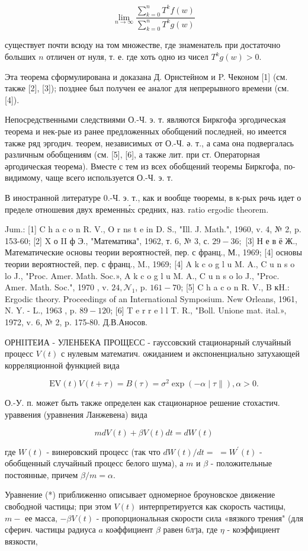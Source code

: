 \documentclass[10pt]{article}
\begin{document}
\[
\lim _{n \rightarrow \infty} \frac{\sum_{k=0}^{n} T^{k} f(w)}{\sum_{k=0}^{n} T^{k} g(w)}
\]

существует почти всюду на том множестве, где знаменатель при достаточно больших $n$ отличен от нуля, т. е. где хоть одно из чисел $T^{k} g(w)>0$.

Эта теорема сформулирована и доказана Д. Орнстейном и P. Чеконом [1] (см. также [2], [3]); позднее был получен ее аналог для непрерывного времени (см. [4]).

Непосредственными следствиями О.-Ч. э. т. являются Биркгофа эргодическая теорема и нек-рые из ранее предложенных обобщений последней, но имеется также ряд эргодич. теорем, независимых от О.-Ч. ә. т., а сама она подвергалась различным обобщениям (см. [5], [6], а также лит. при ст. Операторная әргодическая теорема). Вместе с тем из всех обобщений теоремы Биркгофа, по-видимому, чаще всего используется О.-Ч. э. т.

В иностранной литературе 0.-Ч. э. т., как и вообще төоремы, в к-рых рөчь идет о пределе отношевия двух временны́x средних, наз. ratio ergodic theorem.

Jum.: [1] C h a c o n R. V., O r ns t e in D. S., "Ill. J. Math.", 1960, v. 4, № 2, p. 153-60; [2] X о II ф Э., "Математика", 1962, т. 6, № 3, с. $29-36 ;$ [3] Н е в ё Ж., Математические
основы теории вероятностей, пер. с франц., М., 1969; [4] основы теории вероятностей, пер. с франц., M., 1969; [4]
A k c o g l u M. A., C u n s o lo J., "Proc. Amer. Math. Soc.», A k c o g l u M. A., C u n s o lo J., "Proc. Amer. Math. Soc.",
1970 , v. $24, \mathcal{N}_{1}$, p. $161-70$; [5] C h a c o n R. V., B кH.: Ergodic theory. Proceedings of an International Symposium. New Orleans, 1961, N. Y. - L., 1963 , p. $89-120$; [6] T e r r e l l T. R., "Boll. Unione mat. ital.», 1972, v. 6, № 2, p. 175-80. Д.В.Аносов.

ОРНIIТЕИА - УЛЕНБЕКА ПРОЩЕСС - гауссовский стационарный случайный процесс $V(t)$ с нулевым математич. ожиданием и әкспоненциально затухающей корреляционной функцией вида

\[
\mathrm{EV}(t) V(t+\tau)=B(\tau)=\sigma^{2} \exp (-\alpha \mid \tau \|), \alpha>0 .
\]

О.-У. п. может быть также определен как стационарное решение стохастич. ураввения (уравнения Ланжевена) вида

\[
m d V(t)+\beta V(t) d t=d W(t)
\]

где $W(t)$ - винеровский процесс (так что $d W(t) / d t=$ $=W^{\prime}(t)$ - обобщенный случайный процесс белого шума), а $m$ и $\beta$ - положительные постоянные, причем $\beta / m=\alpha$.

Уравнение (*) приближенно описывает одномерное броуновское движение свободной частицы; при этом $V(t)$ интерпретируется как скорость частицы, $m-$ ее масса, $-\beta V(t)$ - пропорциональная скорости сила «вязкого трения" (для сферич. частицы радиуса $a$ коәффициент $\beta$ равен 6лๆа, где $\eta$ - коэффициент вязкости,
\end{document}

